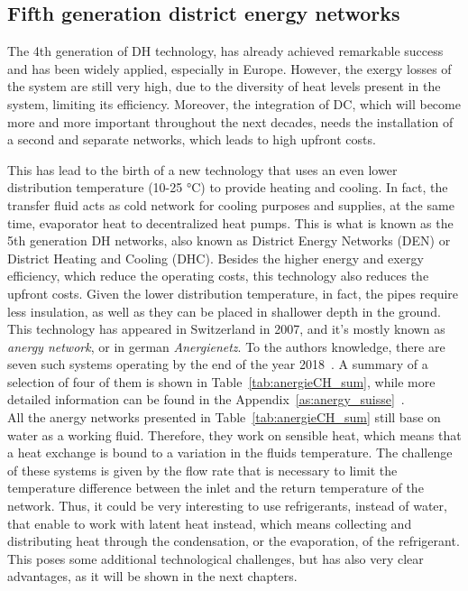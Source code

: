 \documentclass{article}
\begin{document}
\subsection{Fifth generation district energy networks}\label{ss:5gden}
The 4th generation of DH technology, has already achieved remarkable success and has been widely applied, especially in Europe. However, the exergy losses of the system are still very high, due to the diversity of heat levels present in the system, limiting its efficiency. Moreover, the integration of DC, which will become more and more important throughout the next decades, needs the installation of a second and separate networks, which leads to high upfront costs. 

This has lead to the birth of a new technology that uses an even lower distribution temperature (10-25 \si{\celsius}) to provide heating and cooling. In fact, the transfer fluid acts as cold network for cooling purposes and supplies, at the same time, evaporator heat to decentralized heat pumps. This is what is known as the 5th generation DH networks, also known as District Energy Networks (DEN) or District Heating and Cooling (DHC). Besides the higher energy and exergy efficiency, which reduce the operating costs, this technology also reduces the upfront costs. Given the lower distribution temperature, in fact, the pipes require less insulation, as well as they can be placed in shallower depth in the ground.\\

This technology has appeared in Switzerland in 2007, and it's mostly known as \textit{anergy network}, or in german \textit{Anergienetz}. To the authors knowledge, there are seven such systems operating by the end of the year 2018~\cite{energieschweizFallbeispieleThermischeNetze2018}. A summary of a selection of four of them is shown in Table~\ref{tab:anergieCH_sum}, while more detailed information can be found in the Appendix~\ref{as:anergy_suisse}~\cite{energieschweizFallbeispieleThermischeNetze2018}.\\



All the anergy networks presented in Table~\ref{tab:anergieCH_sum} still base on water as a working fluid. Therefore, they work on sensible heat, which means that a heat exchange is bound to a variation in the fluids temperature. The challenge of these systems is given by the flow rate that is necessary to limit the temperature difference between the inlet and the return temperature of the network. Thus, it could be very interesting to use refrigerants, instead of water, that enable to work with latent heat instead, which means collecting and distributing heat through the condensation, or the evaporation, of the refrigerant. This poses some additional technological challenges, but has also very clear advantages, as it will be shown in the next chapters.\\
\end{document}
